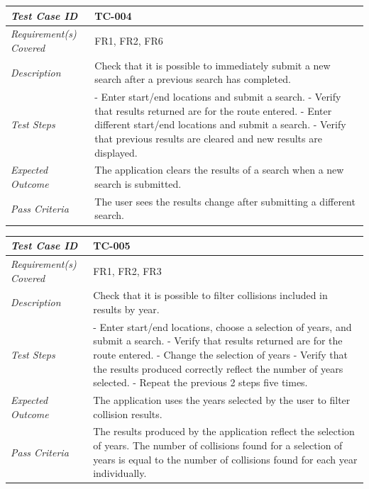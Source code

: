 \documentclass[authoryearcitations]{UoYCSproject}
\begin{document}
\begin{tabular}{| p{2.5cm} | p{11cm} |}
	\hline
	\textit{Test Case ID} & TC-004 \\ \hline
	\textit{Requirement(s) Covered} & FR1, FR2, FR6 \\ \hline
	\textit{Description} & Check that it is possible to immediately submit a new search after a previous search has completed. \\ \hline
	\textit{Test Steps}& - Enter start/end locations and submit a search.
	\newline - Verify that results returned are for the route entered.
	\newline - Enter different start/end locations and submit a search.
	\newline - Verify that previous results are cleared and new results are displayed.
 \\ \hline
	\textit{Expected Outcome} & The application clears the results of a search when a new search is submitted.  \\ \hline
	\textit{Pass Criteria} & The user sees the results change after submitting a different search.  \\ \hline
\end{tabular}

\begin{tabular}{| p{2.5cm} | p{11cm} |}
	\hline
	\textit{Test Case ID} & TC-005 \\ \hline
	\textit{Requirement(s) Covered} & FR1, FR2, FR3 \\ \hline
	\textit{Description} & Check that it is possible to filter collisions included in results by year. \\ \hline
	\textit{Test Steps}& - Enter start/end locations, choose a selection of years, and submit a search.
	\newline - Verify that results returned are for the route entered.
	\newline - Change the selection of years
	\newline - Verify that the results produced correctly reflect the number of years selected.
	\newline - Repeat the previous 2 steps five times.
 \\ \hline
	\textit{Expected Outcome} & The application uses the years selected by the user to filter collision results.  \\ \hline
	\textit{Pass Criteria} & The results produced by the application reflect the selection of years. The number of collisions found for a selection of years is equal to the number of collisions found for each year individually.  \\ \hline
\end{tabular}
\end{document}
